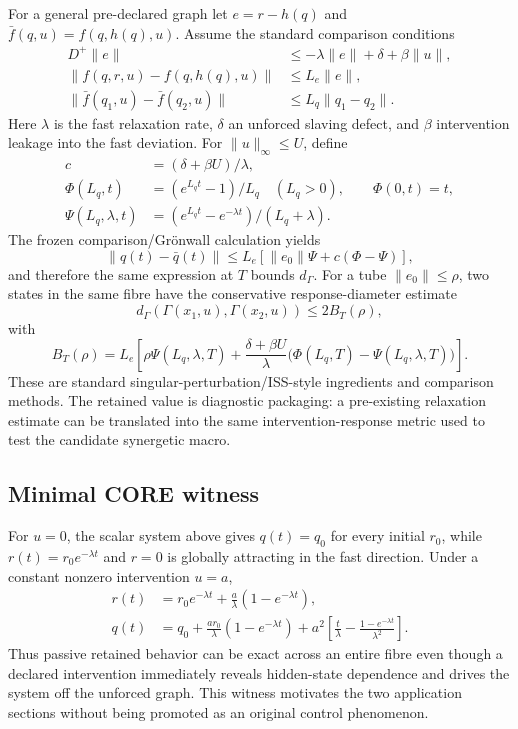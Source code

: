 For a general pre-declared graph let $e=r-h(q)$ and $\bar f(q,u)=f(q,h(q),u)$. Assume the standard comparison conditions
\begin{align}
D^+\lVert e\rVert &\le -\lambda\lVert e\rVert+\delta+\beta\lVert u\rVert,\\
\lVert f(q,r,u)-f(q,h(q),u)\rVert &\le L_e\lVert e\rVert,\\
\lVert \bar f(q_1,u)-\bar f(q_2,u)\rVert &\le L_q\lVert q_1-q_2\rVert.
\end{align}
Here $\lambda$ is the fast relaxation rate, $\delta$ an unforced slaving defect, and $\beta$ intervention leakage into the fast deviation. For $\lVert u\rVert_\infty\le U$, define
\begin{align}
c&=(\delta+\beta U)/\lambda,\\
\Phi(L_q,t)&=(e^{L_qt}-1)/L_q\quad (L_q>0),\qquad \Phi(0,t)=t,\\
\Psi(L_q,\lambda,t)&=(e^{L_qt}-e^{-\lambda t})/(L_q+\lambda).
\end{align}
The frozen comparison/Gr\"onwall calculation yields
\begin{equation}
\lVert q(t)-\bar q(t)\rVert\le L_e\left[\lVert e_0\rVert\Psi+c(\Phi-\Psi)\right],
\end{equation}
and therefore the same expression at $T$ bounds $d_\Gamma$. For a tube $\lVert e_0\rVert\le\rho$, two states in the same fibre have the conservative response-diameter estimate
\begin{equation}
d_\Gamma(\Gamma(x_1,u),\Gamma(x_2,u))\le 2B_T(\rho),
\end{equation}
with
\begin{equation}
B_T(\rho)=L_e\left[\rho\Psi(L_q,\lambda,T)+\frac{\delta+\beta U}{\lambda}\bigl(\Phi(L_q,T)-\Psi(L_q,\lambda,T)\bigr)\right].
\end{equation}
These are standard singular-perturbation/ISS-style ingredients and comparison methods.\cite{Kokotovic1976,ChristofidesTeel1996} The retained value is diagnostic packaging: a pre-existing relaxation estimate can be translated into the same intervention-response metric used to test the candidate synergetic macro.

\subsection{Minimal CORE witness}

For $u=0$, the scalar system above gives $q(t)=q_0$ for every initial $r_0$, while $r(t)=r_0e^{-\lambda t}$ and $r=0$ is globally attracting in the fast direction. Under a constant nonzero intervention $u=a$,
\begin{align}
r(t)&=r_0e^{-\lambda t}+\frac{a}{\lambda}(1-e^{-\lambda t}),\\
q(t)&=q_0+\frac{ar_0}{\lambda}(1-e^{-\lambda t})+a^2\left[\frac{t}{\lambda}-\frac{1-e^{-\lambda t}}{\lambda^2}\right].
\end{align}
Thus passive retained behavior can be exact across an entire fibre even though a declared intervention immediately reveals hidden-state dependence and drives the system off the unforced graph. This witness motivates the two application sections without being promoted as an original control phenomenon.

